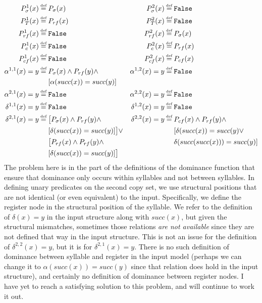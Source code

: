 \documentclass{article}
\newcommand\myeq{\mathrel{\stackrel{\makebox[0pt]{\mbox{\normalfont\tiny def}}}{=}}}
\begin{document}
\begin{equation}
\begin{aligned}
P^1_{\sigma}(x) &\myeq P_{\sigma}(x) &  P^2_{\sigma}(x) &\myeq \mathtt{False} \\
P^1_{T}(x) &\myeq P_{rf}(x) &  P^2_{T}(x) &\myeq \mathtt{False} \\
P^1_{rf}(x) &\myeq \mathtt{False} &  P^2_{rf}(x) &\myeq P_{\sigma}(x) \\
P^1_{c}(x) &\myeq \mathtt{False} &  P^2_{c}(x) &\myeq P_{rf}(x) \\
P^1_{cf}(x) &\myeq \mathtt{False} &  P^2_{cf}(x) &\myeq P_{cf}(x) \\
\alpha^{1,1}(x)=y &\myeq P_{\sigma}(x)\land P_{rf}(y)\land  & \alpha^{1,2}(x)=y &\myeq \mathtt{False}  \\
&\quad \, \, [\alpha(succ(x))=succ(y)] \\
\alpha^{2,1}(x)=y &\myeq \mathtt{False} & \alpha^{2,2}(x)=y &\myeq \mathtt{False}  \\
\delta^{1,1}(x)=y &\myeq \mathtt{False} & \delta^{1,2}(x)=y &\myeq \mathtt{False}  \\
\delta^{2,1}(x)=y &\myeq\big[P_{\sigma}(x) \land P_{rf}(y) \land  & \delta^{2,2}(x)=y &\myeq P_{cf}(x)\land P_{rf}(y)\land \\
&\quad \, \, [\delta(succ(x))=succ(y)]\big]\lor & &\quad \, \, [\delta(succ(x))=succ(y)\lor  \\
&\quad \, \, \big[P_{rf}(x)\land P_{rf}(y)\land & & \quad \, \, \delta(succ(succ(x)))=succ(y)]\\
&\quad \, \, [\delta(succ(x))=succ(y)]\big] \\
\end{aligned}
\end{equation}
The problem here is in the part of the definitions of the dominance function that ensure that dominance only occurs within syllables and not between syllables. In defining unary predicates on the second copy set, we use structural positions that are not identical (or even equivalent) to the input. Specifically, we define the register node in the structural position of the syllable. We refer to the definition of $\delta(x)=y$ in the input structure along with $succ(x)$, but given the structural mismatches, sometimes those relations \emph{are not available} since they are not defined that way in the input structure. This is not an issue for the definition of $\delta^{2,2}(x)=y$, but it is for $\delta^{2,1}(x)=y$. There is no such definition of dominance between syllable and register in the input model (perhaps we can change it to $\alpha(succ(x)) = succ(y)$ since that relation does hold in the input structure), and certainly no definition of dominance between register nodes. I have yet to reach a satisfying solution to this problem, and will continue to work it out.
\end{document}
